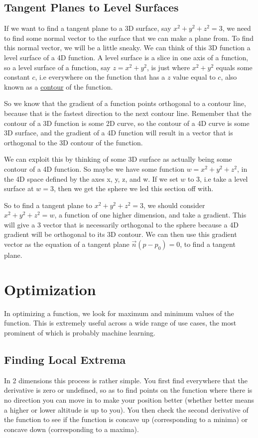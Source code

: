 \documentclass[12pt, letterpaper]{article}
\begin{document}
\subsection{Tangent Planes to Level Surfaces}
If we want to find a tangent plane to a 3D surface, say $x^2 + y^2 + z^2 = 3$, we need to find some normal vector to the surface that we can make a plane from. To find this normal vector, we will be a little sneaky. We can think of this 3D function a level surface of a 4D function. A level surface is a slice in one axis of a function, so a level surface of a function, say $z = x^2 + y^2$, is just where $x^2 + y^2$ equals some constant $c$, i.e everywhere on the function that has a $z$ value equal to $c$, also known as a \hyperref[sssec:Contour Maps]{contour} of the function.

So we know that the gradient of a function points orthogonal to a contour line, because that is the fastest direction to the next contour line. Remember that the contour of a 3D function is some 2D curve, so the contour of a 4D curve is some 3D surface, and the gradient of a 4D function will result in a vector that is orthogonal to the 3D contour of the function. 

We can exploit this by thinking of some 3D surface as actually being some contour of a 4D function. So maybe we have some function $w = x^2 + y^2 + z^2$, in the 4D space defined by the axes x, y, z, and w. If we set $w$ to $3$, i.e take a level surface at $w=3$, then we get the sphere we led this section off with.

So to find a tangent plane to $x^2 + y^2 + z^2 = 3$, we should consider $x^2 + y^2 + z^2 = w$, a function of one higher dimension, and take a gradient. This will give a 3 vector that is necessarily orthogonal to the sphere because a 4D gradient will be orthogonal to its 3D contour. We can then use this gradient vector as the equation of a tangent plane $\vec{n}(p - p_0) = 0$, to find a tangent plane.

\section{Optimization}

In optimizing a function, we look for maximum and minimum values of the function. This is extremely useful across a wide range of use cases, the most prominent of which is probably machine learning.

\subsection{Finding Local Extrema}
In 2 dimensions this process is rather simple. You first find everywhere that the derivative is zero or undefined, so as to find points on the function where there is no direction you can move in to make your position better (whether better means a higher or lower altitude is up to you). You then check the second derivative of the function to see if the function is concave up (corresponding to a minima) or concave down (corresponding to a maxima).
\end{document}
